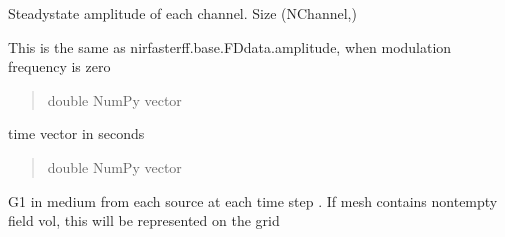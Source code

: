 \documentclass[letterpaper,10pt,english]{sphinxmanual}
\begin{document}
\begin{fulllineitems}
\begin{fulllineitems}
\begin{quote}
\begin{description}
\end{description}\end{quote}

\end{fulllineitems}


\begin{fulllineitems}
\label{\detokenize{_autosummary/nirfasterff.base.data.DCSdata:nirfasterff.base.data.DCSdata.amplitude}}
\pysigstartsignatures
{}
\pysigstopsignatures
\sphinxAtStartPar
Steady\sphinxhyphen{}state amplitude of each channel. Size (NChannel,)

\sphinxAtStartPar
This is the same as nirfasterff.base.FDdata.amplitude, when modulation frequency is zero
\begin{quote}\begin{description}
\sphinxAtStartPar
double NumPy vector

\end{description}\end{quote}

\end{fulllineitems}


\begin{fulllineitems}
\label{\detokenize{_autosummary/nirfasterff.base.data.DCSdata:nirfasterff.base.data.DCSdata.tau_DCS}}
\pysigstartsignatures
{}
\pysigstopsignatures
\sphinxAtStartPar
time vector in seconds
\begin{quote}\begin{description}
\sphinxAtStartPar
double NumPy vector

\end{description}\end{quote}

\end{fulllineitems}


\begin{fulllineitems}
\label{\detokenize{_autosummary/nirfasterff.base.data.DCSdata:nirfasterff.base.data.DCSdata.phi_DCS}}
\pysigstartsignatures
{}
\pysigstopsignatures
\sphinxAtStartPar
G1 in medium from each source at each time step . If mesh contains non\sphinxhyphen{}tempty field vol, this will be represented on the grid


\end{fulllineitems}
\end{fulllineitems}
\end{document}
